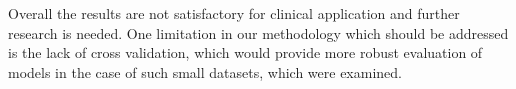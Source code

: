 \documentclass[runningheads]{llncs}
\begin{document}
Overall the results are not satisfactory for clinical application and further research is needed. One limitation in our methodology which should be addressed is the lack of cross validation, which would provide more robust evaluation of models in the case of such small datasets, which were examined.






\end{document}
